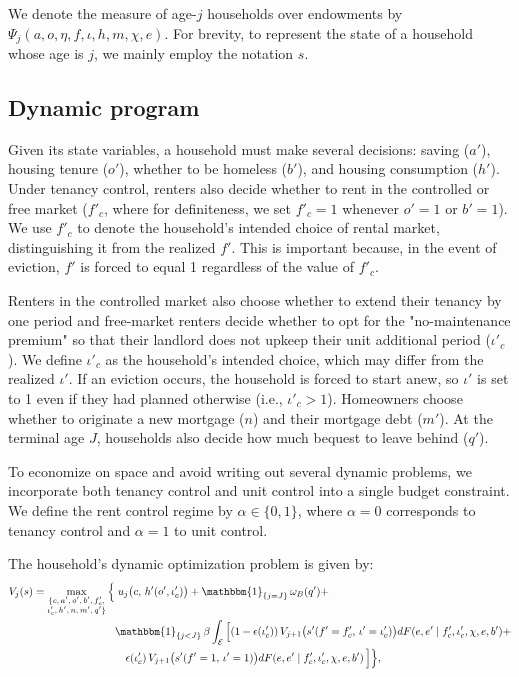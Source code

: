 \documentclass[parskip=full]{article}
\begin{document}
\noindent We denote the measure of age-$j$ households over endowments by $\Psi_{j}(a,o,\eta,f,\iota,h,m,\chi,e)$. For brevity, to represent the state of a household whose age is $j$, we mainly employ the notation $s$.

\subsection{Dynamic program}\label{subsection:household_optimization}
Given its state variables, a household must make several decisions: saving ($a'$), housing tenure ($o'$), whether to be homeless ($b'$), and housing consumption ($h'$). Under tenancy control, renters also decide whether to rent in the controlled or free market ($f'_{c}$, where for definiteness, we set $f'_{c}=1$ whenever $o'=1$ or $b'=1$). We use $f'_c$ to denote the household's intended choice of rental market, distinguishing it from the realized $f'$. This is important because, in the event of eviction, $f'$ is forced to equal 1 regardless of the value of $f'_c$.

Renters in the controlled market also choose whether to extend their tenancy by one period and free-market renters decide whether to opt for the "no-maintenance premium" so that their landlord does not upkeep their unit additional period ($\iota'_c$). We define $\iota'_c$ as the household's intended choice, which may differ from the realized $\iota'$. If an eviction occurs, the household is forced to start anew, so $\iota'$ is set to 1 even if they had planned otherwise (i.e., $\iota'_c > 1$). Homeowners choose whether to originate a new mortgage ($n$) and their mortgage debt ($m'$). At the terminal age $J$, households also decide how much bequest to leave behind ($q'$).

To economize on space and avoid writing out several dynamic problems, we incorporate both tenancy control and unit control into a single budget constraint. We define the rent control regime by $\alpha \in \{0,1\}$, where $\alpha=0$ corresponds to tenancy control and $\alpha=1$ to unit control.

The household's dynamic optimization problem is given by:
\begin{equation}\label{eq:vf}
\begin{aligned}
V_{j}(s) 
= \max_{\substack{\{c,\, a',\, o',\, b',\, f'_c, \\ \iota'_c,\, h',\, n,\, m',\, q'\}}} \Big\{
& \; u_{j}\big( c,\, h'( o', \iota'_c ) \big)
+ \mathbbm{1}_{\{ j = J \}}\, \omega_{B}(q')+ \\
& \mathbbm{1}_{\{ j < J \}}\, \beta 
\int_{\mathcal{E}} \Big[
(1 - \epsilon(\iota'_c))\, V_{j+1}\big( s'( f' = f'_c,\, \iota' = \iota'_c ) \big)dF(e, e' \mid f'_c, \iota'_c, \chi, e, b') +\\ & \quad \epsilon(\iota'_c)\, V_{j+1}\big( s'( f' = 1,\, \iota' = 1 ) \big)dF(e, e' \mid f'_c, \iota'_c, \chi, e, b') \,  \Big]
\Big\},
\end{aligned}
\end{equation}
\end{document}
